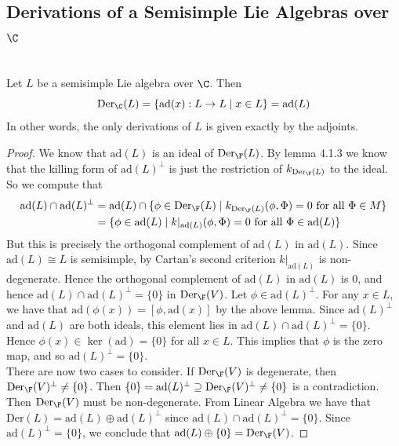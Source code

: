 \documentclass[a4paper]{article}
\begin{document}
\subsection{Derivations of a Semisimple Lie Algebras over $\C$}
\begin{prp}{}{} \\Let $L$ be a semisimple Lie algebra over $\C$. Then $$\text{Der}_\C(L)=\{\text{ad}(x):L\to L\;|\;x\in L\}=\text{ad}(L)$$ In other words, the only derivations of $L$ is given exactly by the adjoints. 
\begin{proof}
We know that $\text{ad}(L)$ is an ideal of $\text{Der}_\F(L)$. By lemma 4.1.3 we know that the killing form of $\text{ad}(L)^\perp$ is just the restriction of $k_{\text{Der}_\F(L)}$ to the ideal. So we compute that 
\begin{align*}
\text{ad}(L)\cap\text{ad}(L)^\perp&=\text{ad}(L)\cap\{\phi\in\text{Der}_\F(L)\;|\;k_{\text{Der}_\F(L)}(\phi,\Phi)=0\text{ for all }\Phi\in M\}\\
&=\{\phi\in\text{ad}(L)\;|\;k|_{\text{ad}(L)}(\phi,\Phi)=0\text{ for all }\Phi\in\text{ad}(L)\}
\end{align*}
But this is precisely the orthogonal complement of $\text{ad}(L)$ in $\text{ad}(L)$. Since $\text{ad}(L)\cong L$ is semisimple, by Cartan's second criterion $k|_{\text{ad}(L)}$ is non-degenerate. Hence the orthogonal complement of $\text{ad}(L)$ in $\text{ad}(L)$ is $0$, and hence $\text{ad}(L)\cap\text{ad}(L)^\perp=\{0\}$ in $\text{Der}_\F(V)$. Let $\phi\in\text{ad}(L)^\perp$. For any $x\in L$, we have that $\text{ad}(\phi(x))=[\phi,\text{ad}(x)]$ by the above lemma. Since $\text{ad}(L)^\perp$ and $\text{ad}(L)$ are both ideals, this element lies in $\text{ad}(L)\cap\text{ad}(L)^\perp=\{0\}$. Hence $\phi(x)\in\ker(\text{ad})=\{0\}$ for all $x\in L$. This implies that $\phi$ is the zero map, and so $\text{ad}(L)^\perp=\{0\}$. \\

There are now two cases to consider. If $\text{Der}_\F(V)$ is degenerate, then $\text{Der}_\F(V)^\perp\neq\{0\}$. Then $\{0\}=\text{ad}(L)^\perp\supseteq\text{Der}_\F(V)^\perp\neq\{0\}$ is a contradiction. Then $\text{Der}_\F(V)$ must be non-degenerate. From Linear Algebra we have that $\text{Der}(L)=\text{ad}(L)\oplus\text{ad}(L)^\perp$ since $\text{ad}(L)\cap\text{ad}(L)^\perp=\{0\}$. Since $\text{ad}(L)^\perp=\{0\}$, we conclude that $\text{ad}(L)\oplus\{0\}=\text{Der}_\F(V)$. 
\end{proof}
\end{prp}
\end{document}

